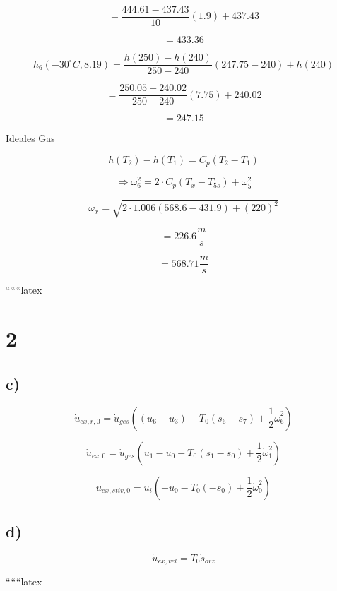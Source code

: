 \[
= \frac{444.61 - 437.43}{10} (1.9) + 437.43
\]

\[
= 433.36
\]

\[
h_6 (-30^\circ C, 8.19) = \frac{h(250) - h(240)}{250 - 240} (247.75 - 240) + h(240)
\]

\[
= \frac{250.05 - 240.02}{250 - 240} (7.75) + 240.02
\]

\[
= 247.15
\]

Ideales Gas

\[
h(T_2) - h(T_1) = C_p (T_2 - T_1)
\]

\[
\Rightarrow \omega_6^2 = 2 \cdot C_p (T_{x} - T_{5s}) + \omega_5^2
\]

\[
\omega_x = \sqrt{2 \cdot 1.006 (568.6 - 431.9) + (220)^2}
\]

\[
= 226.6 \frac{m}{s}
\]

\[
= 568.71 \frac{m}{s}
\]

``````latex

\section*{2}

\subsection*{c)}

\[
\dot{u}_{ex,r,0} = \dot{u}_{ges}((u_6 - u_3) - T_0 (s_6 - s_7) + \frac{1}{2} \dot{\omega}_6^2)
\]

\[
\dot{u}_{ex,0} = \dot{u}_{ges}(u_1 - u_0 - T_0 (s_1 - s_0) + \frac{1}{2} \dot{\omega}_1^2)
\]

\[
\dot{u}_{ex,stiv,0} = \dot{u}_i (-u_0 - T_0 (-s_0) + \frac{1}{2} \dot{\omega}_0^2)
\]

\subsection*{d)}

\[
\dot{u}_{ex,vel} = T_0 \dot{s}_{orz}
\]

``````latex



